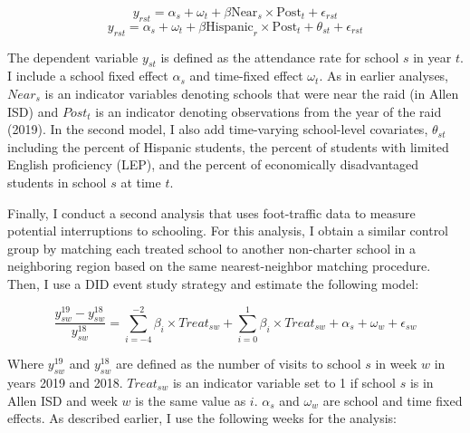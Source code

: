 \documentclass[hidelinks,twoside]{article}
\begin{document}
\begin{equation*}
       y_{rst} = \alpha_{s} + \omega_{t} + \beta \text{Near}_{s} \times \text{Post}_{t} + \epsilon_{rst}
    \end{equation*}
\begin{equation*}
    y_{rst} = \alpha_{s} + \omega_{t} + \beta \text{Hispanic}_{r} \times \text{Post}_{t} + \theta_{st} + \epsilon_{rst}
\end{equation*}

\noindent The dependent variable $y_{st}$ is defined as the attendance rate for school $s$ in year $t$. I include a school fixed effect $\alpha_s$ and time-fixed effect $\omega_t$. As in earlier analyses, $Near_{s}$ is an indicator variables denoting schools that were near the raid (in Allen ISD) and $Post_t$ is an indicator denoting observations from the year of the raid (2019). In the second model, I also add time-varying school-level covariates, $\theta_{st}$ including the percent of Hispanic students, the percent of students with limited English proficiency (LEP), and the percent of economically disadvantaged students in school $s$ at time $t$.

Finally, I conduct a second analysis that uses foot-traffic data to measure potential interruptions to schooling. For this analysis, I obtain a similar control group by matching each treated school to another non-charter school in a neighboring region based on the same nearest-neighbor matching procedure. Then, I use a DID event study strategy and estimate the following model:

\begin{equation*}
    \frac{y_{sw}^{19}-y_{sw}^{18}}{y_{sw}^{18}} = \sum_{i=-4}^{-2} \beta_{i} \times Treat_{sw} + \sum_{i=0}^{1} \beta_{i} \times Treat_{sw} + \alpha_{s} + \omega_{w} + \epsilon_{sw}
\end{equation*}

\noindent Where $y_{sw}^{19}$ and $y_{sw}^{18}$ are defined as the number of visits to school $s$ in week $w$ in years 2019 and 2018. $Treat_{sw}$ is an indicator variable set to 1 if school $s$ is in Allen ISD and week $w$ is the same value as $i$. $\alpha_s$ and $\omega_w$ are school and time fixed effects. As described earlier, I use the following weeks for the analysis:
\end{document}
